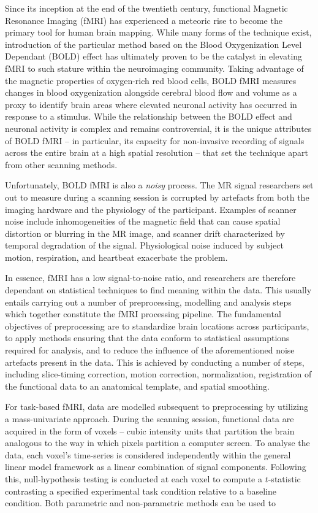 Since its inception at the end of the twentieth century, functional Magnetic Resonance Imaging (fMRI) has experienced a meteoric rise to become the primary tool for human brain mapping. While many forms of the technique exist, introduction of the particular method based on the Blood Oxygenization Level Dependant (BOLD) effect has ultimately proven to be the catalyst in elevating fMRI to such stature within the neuroimaging community. Taking advantage of the magnetic properties of oxygen-rich red blood cells, BOLD fMRI measures changes in blood oxygenization alongside cerebral blood flow and volume as a proxy to identify brain areas where elevated neuronal activity has occurred in response to a stimulus. While the relationship between the BOLD effect and neuronal activity is complex and remains controversial, it is the unique attributes of BOLD fMRI -- in particular, its capacity for non-invasive recording of signals across the entire brain at a high spatial resolution -- that set the technique apart from other scanning methods.

Unfortunately, BOLD fMRI is also a \textit{noisy} process. The MR signal researchers set out to measure during a scanning session is corrupted by artefacts from both the imaging hardware and the physiology of the participant. Examples of scanner noise include inhomogeneities of the magnetic field that can cause spatial distortion or blurring in the MR image, and scanner drift characterized by temporal degradation of the signal. Physiological noise induced by subject motion, respiration, and heartbeat exacerbate the problem. 

In essence, fMRI has a low signal-to-noise ratio, and researchers are therefore dependant on statistical techniques to find meaning within the data. This usually entails carrying out a number of preprocessing, modelling and analysis steps which together constitute the fMRI processing pipeline. The fundamental objectives of preprocessing are to standardize brain locations across participants, to apply methods ensuring that the data conform to statistical assumptions required for analysis, and to reduce the influence of the aforementioned noise artefacts present in the data. This is achieved by conducting a number of steps, including slice-timing correction, motion correction, normalization, registration of the functional data to an anatomical template, and spatial smoothing. 

For task-based fMRI, data are modelled subsequent to preprocessing by utilizing a mass-univariate approach. During the scanning session, functional data are acquired in the form of voxels -- cubic intensity units that partition the brain analogous to the way in which pixels partition a computer screen. To analyse the data, each voxel's time-series is considered independently within the general linear model framework as a linear combination of signal components. Following this, null-hypothesis testing is conducted at each voxel to compute a $t$-statistic contrasting a specified experimental task condition relative to a baseline condition. Both parametric and non-parametric methods can be used to 